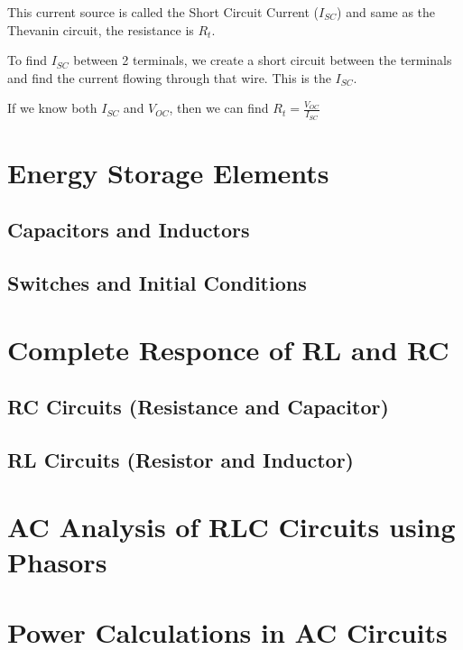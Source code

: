 \documentclass[12pt,letterpaper]{article} \usepackage{amsmath} \usepackage{graphicx} \usepackage[margin=1in]{geometry} \usepackage{longtable}  \usepackage{amssymb}
\begin{document}
	This current source is called the Short Circuit Current ($I_{SC}$) and same as the Thevanin circuit, the resistance is $R_t$.
	
	To find $I_{SC}$ between 2 terminals, we create a short circuit between the terminals and find the current flowing through that wire. This is the $I_{SC}$.
	
	If we know both $I_{SC}$ and $V_{OC}$, then we can find $R_t = \frac{V_{OC}}{I_{SC}}$
	
	\section{Energy Storage Elements}
	
	\subsection{Capacitors and Inductors}
	
	\subsection{Switches and Initial Conditions}
	
	\section{Complete Responce of RL and RC}
	
	\subsection{RC Circuits (Resistance and Capacitor)}
	
	\subsection{RL Circuits (Resistor and Inductor)}
	
	\section{AC Analysis of RLC Circuits using Phasors}
	
	\section{Power Calculations in AC Circuits}
	
\end{document}
